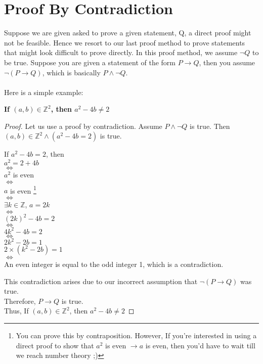 \section{Proof By Contradiction}
Suppose we are given asked to prove a given statement, Q, a direct proof might
not be feasible. Hence we resort to our last proof method to prove statements
that might look difficult to prove directly. In this proof method, we assume
$\neg Q$ to be true. Suppose you are given a statement of the form $P
\rightarrow Q$, then you assume $\neg (P \rightarrow Q)$, which is basically $P
\wedge \neg Q$. \\ \\
Here is a simple example:
\begin{center}
    \textbf{If $(a,b) \in \mathbb{Z}^{2}$, then $a^{2} - 4b \neq 2$}
\end{center}
\begin{proof}
    Let us use a proof by contradiction. Assume $P \wedge \neg Q$ is true. Then
    $(a,b) \in \mathbb{Z}^{2} \wedge (a^{2} -4b = 2)$ is true.
    \begin{center}
        If $a^{2} - 4b = 2$, then \\
        $a^{2} = 2 + 4b$ \\
        $\Leftrightarrow$ \\
        $a^{2}$ is even \\
        $\Leftrightarrow$ \\
        $a$ is even \footnote{You can prove this by contraposition. However, If
        you're interested in using a direct proof to show that $a^{2}$ is even
        $\rightarrow a$ is even, then you'd have to wait till we reach number
        theory ;)} \\
        $\Leftrightarrow$ \\
        $\exists k \in \mathbb{Z}$, $a = 2k$ \\
        $\Leftrightarrow$ \\
        $(2k)^{2} - 4b = 2$ \\
        $\Leftrightarrow$ \\
        $4k^{2} - 4b = 2$ \\
        $\Leftrightarrow$ \\
        $2k^{2} - 2b = 1$ \\
        $2 \times (k^{2} - 2b) = 1$ \\
        $\Leftrightarrow$ \\
        An even integer is equal to the odd integer 1, which is a
        contradiction.
    \end{center}
    This contradiction arises due to our incorrect assumption that $\neg (P
    \rightarrow Q)$ was true. \\
    Therefore, $P \rightarrow Q$ is true. \\
    Thus, If $(a,b) \in \mathbb{Z}^{2}$, then $a^{2} - 4b \neq 2$
\end{proof}
